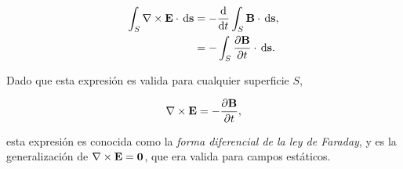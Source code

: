 \begin{align*}
	\int_{S} \rotational{\E} \cdot \dl{\textbf{s}} &= -\diff*{ \int_{S} \B \cdot \dl{\textbf{s}} }{t},\\
	&= - \int_{S} \diffp{\B}{t} \cdot \dl{\textbf{s}}.
\end{align*}

Dado que esta expresión es valida para cualquier superficie $S$,

\begin{equation}
\label{Eq:LeyFaradayDiferencial}
	\rotational{\E} = -\diffp{\B}{t},
\end{equation}

esta expresión es conocida como la \emph{forma diferencial de la ley de Faraday}, y es la generalización de $\nabla \times \textbf{E} = \textbf{0}$, que era valida para campos estáticos.

